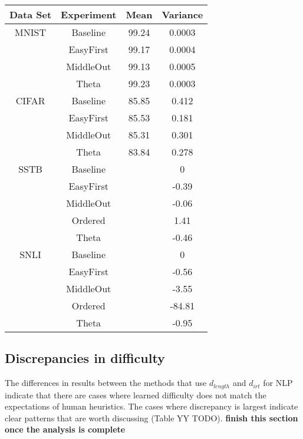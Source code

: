 \documentclass[letterpaper]{article} %
\begin{document}
\begin{table*}[h!]
	\centering 
	\begin{tabular}{cccc}
		\toprule
		Data Set & Experiment & Mean & Variance \\ 
		\midrule
		MNIST & Baseline & 99.24&	0.0003
		\\
		\cmidrule{2-4}
		& EasyFirst & 99.17&	0.0004
		\\
		& MiddleOut & 99.13&	0.0005
		\\
		& Theta& 99.23&	 0.0003
		\\
		\midrule
		CIFAR & Baseline & 85.85 &	0.412
		\\
		\cmidrule{2-4}
		& EasyFirst & 85.53	&0.181
		\\
		& MiddleOut & 85.31&0.301
		\\
		& Theta &83.84& 0.278
		\\
		\midrule
		SSTB & Baseline &  &	0
		\\
		\cmidrule{2-4}
		& EasyFirst & &	-0.39
		\\
		& MiddleOut & &	-0.06
		\\
		& Ordered & &	 1.41
		\\
		& Theta &&	-0.46
		\\
		\midrule
		SNLI & Baseline & &	0
		\\
		\cmidrule{2-4}
		& EasyFirst & & 	-0.56
		\\
		& MiddleOut &&	-3.55
		\\
		& Ordered & &	-84.81
		\\
		& Theta& &	-0.95
		\\
		\bottomrule 
	\end{tabular}
	\label{tab:robustness}
\end{table*}


\subsection{Discrepancies in difficulty}
The differences in results between the methods that use $d_{length}$ and $d_{irt}$ for NLP indicate that there are cases where learned difficulty does not match the expectations of human heuristics.
The cases where discrepancy is largest indicate clear patterns that are worth discussing (Table YY TODO).
\textbf{finish this section once the analysis is complete} 
\end{document}
